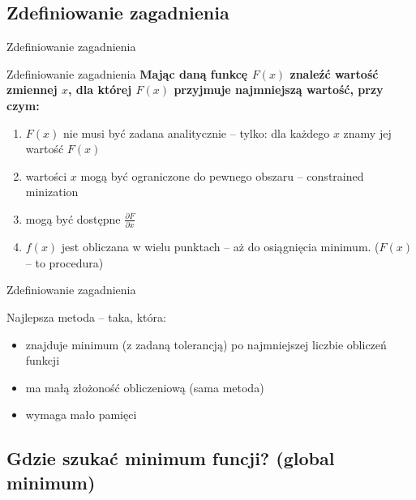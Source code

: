 \subsection{Zdefiniowanie zagadnienia}

  \begin{frame}{Zdefiniowanie zagadnienia}
    \begin{block}{Zdefiniowanie zagadnienia}
      \textbf{Mając daną funkcę $ F(x) $ znaleźć wartość
      zmiennej $ x $, dla której $ F(x) $ przyjmuje
      najmniejszą wartość, przy czym:}
      \begin{enumerate}
        \item $ F(x) $ nie musi być zadana analitycznie --
        tylko: dla każdego $ x $ znamy jej wartość $ F(x) $
        \item wartości $ x $ mogą być ograniczone do pewnego
        obszaru -- constrained minization
        \item mogą być dostępne $ \frac{\partial F}{\partial x} $
        \item $ f(x) $ jest obliczana w wielu punktach --
        aż do osiągnięcia minimum. ($ F(x) $ -- to procedura)
      \end{enumerate}
    \end{block}

  \end{frame}

  \begin{frame}{Zdefiniowanie zagadnienia}
    \begin{block}{Najlepsza metoda -- taka, która:}
      \begin{itemize}
        \item znajduje minimum (z zadaną tolerancją)
        po najmniejszej liczbie obliczeń funkcji
        \item ma małą złożoność obliczeniową (sama
        metoda)
        \item wymaga mało pamięci
      \end{itemize}

    \end{block}

  \end{frame}

\subsection{Gdzie szukać minimum funcji? (global minimum)}

